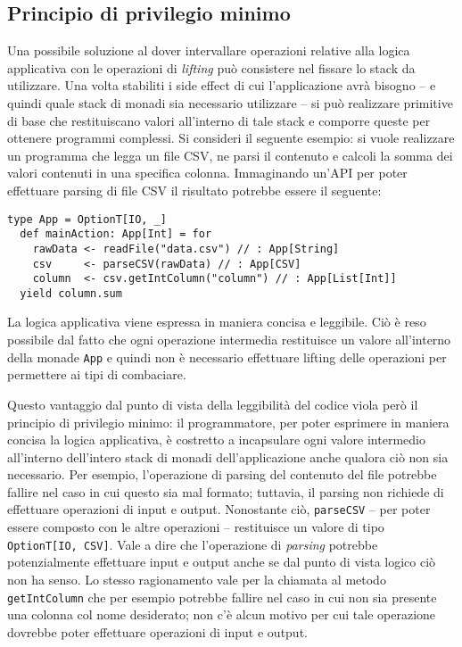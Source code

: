 \subsection{Principio di privilegio minimo}
Una possibile soluzione al dover intervallare operazioni relative alla logica applicativa con le operazioni di \emph{lifting} può consistere nel fissare lo stack da utilizzare. Una volta stabiliti i side effect di cui l'applicazione avrà bisogno -- e quindi quale stack di monadi sia necessario utilizzare -- si può realizzare primitive di base che restituiscano valori all'interno di tale stack e comporre queste per ottenere programmi complessi. Si consideri il seguente esempio: si vuole realizzare un programma che legga un file CSV, ne parsi il contenuto e calcoli la somma dei valori contenuti in una specifica colonna. Immaginando un'API per poter effettuare parsing di file CSV il risultato potrebbe essere il seguente:
\begin{lstlisting}[language=scala3]
  type App = OptionT[IO, _]
  def mainAction: App[Int] = for
    rawData <- readFile("data.csv") // : App[String]
    csv     <- parseCSV(rawData) // : App[CSV]
    column  <- csv.getIntColumn("column") // : App[List[Int]]
  yield column.sum
\end{lstlisting}
La logica applicativa viene espressa in maniera concisa e leggibile. Ciò è reso possibile dal fatto che ogni operazione intermedia restituisce un valore all'interno della monade \lstinline{App} e quindi non è necessario effettuare lifting delle operazioni per permettere ai tipi di combaciare.

Questo vantaggio dal punto di vista della leggibilità del codice viola però il principio di privilegio minimo: il programmatore, per poter esprimere in maniera concisa la logica applicativa, è costretto a incapsulare ogni valore intermedio all'interno dell'intero stack di monadi dell'applicazione anche qualora ciò non sia necessario. Per esempio, l'operazione di parsing del contenuto del file potrebbe fallire nel caso in cui questo sia mal formato; tuttavia, il parsing non richiede di effettuare operazioni di input e output. Nonostante ciò, \lstinline{parseCSV} -- per poter essere composto con le altre operazioni -- restituisce un valore di tipo \lstinline{OptionT[IO, CSV]}. Vale a dire che l'operazione di \emph{parsing} potrebbe potenzialmente effettuare input e output anche se dal punto di vista logico ciò non ha senso.
Lo stesso ragionamento vale per la chiamata al metodo \lstinline{getIntColumn} che per esempio potrebbe fallire nel caso in cui non sia presente una colonna col nome desiderato; non c'è alcun motivo per cui tale operazione dovrebbe poter effettuare operazioni di input e output.

